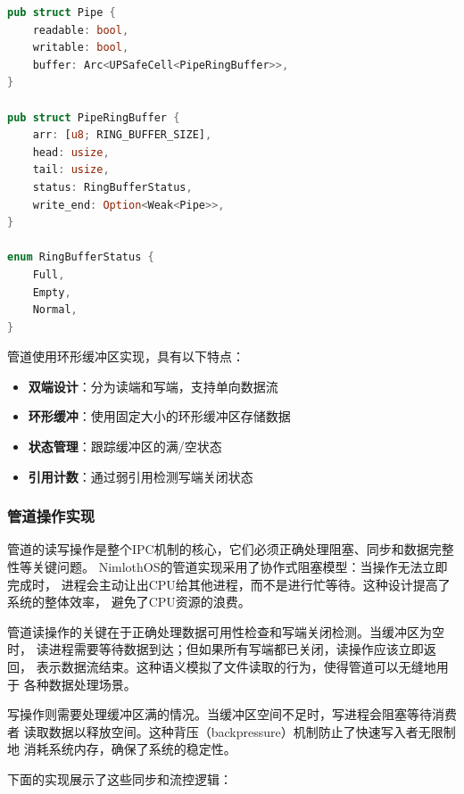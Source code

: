 \begin{lstlisting}[language=Rust,caption={管道结构定义}, label={lst:pipe-structure}]
pub struct Pipe {
    readable: bool,
    writable: bool,
    buffer: Arc<UPSafeCell<PipeRingBuffer>>,
}

pub struct PipeRingBuffer {
    arr: [u8; RING_BUFFER_SIZE],
    head: usize,
    tail: usize,
    status: RingBufferStatus,
    write_end: Option<Weak<Pipe>>,
}

enum RingBufferStatus {
    Full,
    Empty,
    Normal,
}
\end{lstlisting}

管道使用环形缓冲区实现，具有以下特点：
\begin{itemize}
    \item \textbf{双端设计}：分为读端和写端，支持单向数据流
    \item \textbf{环形缓冲}：使用固定大小的环形缓冲区存储数据
    \item \textbf{状态管理}：跟踪缓冲区的满/空状态
    \item \textbf{引用计数}：通过弱引用检测写端关闭状态
\end{itemize}

\subsubsection{管道操作实现}

管道的读写操作是整个IPC机制的核心，它们必须正确处理阻塞、同步和数据完整性等关键问题。
NimlothOS的管道实现采用了协作式阻塞模型：当操作无法立即完成时，
进程会主动让出CPU给其他进程，而不是进行忙等待。这种设计提高了系统的整体效率，
避免了CPU资源的浪费。

管道读操作的关键在于正确处理数据可用性检查和写端关闭检测。当缓冲区为空时，
读进程需要等待数据到达；但如果所有写端都已关闭，读操作应该立即返回，
表示数据流结束。这种语义模拟了文件读取的行为，使得管道可以无缝地用于
各种数据处理场景。

写操作则需要处理缓冲区满的情况。当缓冲区空间不足时，写进程会阻塞等待消费者
读取数据以释放空间。这种背压（backpressure）机制防止了快速写入者无限制地
消耗系统内存，确保了系统的稳定性。

下面的实现展示了这些同步和流控逻辑：

